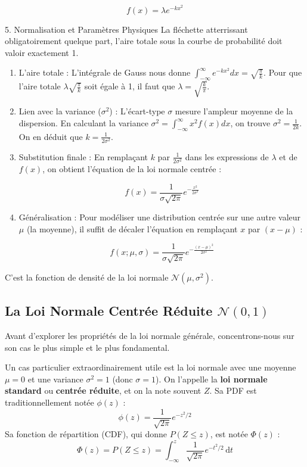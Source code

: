 \begin{proofbox}
$$f(x) = \lambda e^{-k x^2}$$


5. Normalisation et Paramètres Physiques
La fléchette atterrissant obligatoirement quelque part, l'aire totale sous la courbe de probabilité doit valoir exactement 1.
\begin{enumerate}
\item L'aire totale : L'intégrale de Gauss nous donne $\int_{-\infty}^{\infty} e^{-k x^2} dx = \sqrt{\frac{\pi}{k}}$. Pour que l'aire totale $\lambda \sqrt{\frac{\pi}{k}}$ soit égale à 1, il faut que $\lambda = \sqrt{\frac{k}{\pi}}$.
\item Lien avec la variance ($\sigma^2$) : L'écart-type $\sigma$ mesure l'ampleur moyenne de la dispersion. En calculant la variance $\sigma^2 = \int_{-\infty}^{\infty} x^2 f(x) dx$, on trouve $\sigma^2 = \frac{1}{2k}$. On en déduit que $k = \frac{1}{2\sigma^2}$.
\item Substitution finale : En remplaçant $k$ par $\frac{1}{2\sigma^2}$ dans les expressions de $\lambda$ et de $f(x)$, on obtient l'équation de la loi normale centrée :

$$f(x) = \frac{1}{\sigma\sqrt{2\pi}} e^{ -\frac{x^2}{2\sigma^2} }$$



\item Généralisation : Pour modéliser une distribution centrée sur une autre valeur $\mu$ (la moyenne), il suffit de décaler l'équation en remplaçant $x$ par $(x-\mu)$ :

$$f(x; \mu, \sigma) = \frac{1}{\sigma \sqrt{2\pi}} e^{ -\frac{(x-\mu)^2}{2\sigma^2} }$$



\end{enumerate}
C'est la fonction de densité de la loi normale $\mathcal{N}(\mu, \sigma^2)$.
\end{proofbox}

\subsection{La Loi Normale Centrée Réduite $\mathcal{N}(0, 1)$}

Avant d'explorer les propriétés de la loi normale générale, concentrons-nous sur son cas le plus simple et le plus fondamental.

\begin{definitionbox}
Un cas particulier extraordinairement utile est la loi normale avec une moyenne $\mu=0$ et une variance $\sigma^2=1$ (donc $\sigma=1$). On l'appelle la \textbf{loi normale standard} ou \textbf{centrée réduite}, et on la note souvent $Z$. Sa PDF est traditionnellement notée $\phi(z)$ :
$$ \phi(z) = \frac{1}{\sqrt{2\pi}} e^{-z^2/2} $$
Sa fonction de répartition (CDF), qui donne $P(Z \le z)$, est notée $\Phi(z)$ :
$$ \Phi(z) = P(Z \le z) = \int_{-\infty}^z \frac{1}{\sqrt{2\pi}} e^{-t^2/2} \, \mathrm{d}t $$
\end{definitionbox}


